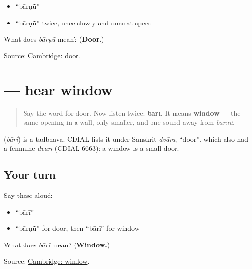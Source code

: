 \begin{itemize}
\raggedright
  \item \textquotedblleft{}bārṇũ\textquotedblright{}
  \item \textquotedblleft{}bārṇũ\textquotedblright{} twice, once slowly and once at speed
\end{itemize}

\begin{tcolorbox}[breakable,colback=teal!4,colframe=teal!35!black,title={Before you move on}]
What does \emph{bārṇũ} mean? (\textbf{Door.})

Source: \href{https://dictionary.cambridge.org/dictionary/english-gujarati/door}{Cambridge: door}.
\end{tcolorbox}
\section[\texorpdfstring{\gu{બારી} (bārī)}{બારી (bārī)}]{ — hear window}

\label{lesson:GU-C28-hear-baari}



\begin{quote}
Say the word for door. Now listen twice: \textbf{bārī}. It means \textbf{window} — the same opening in a wall, only smaller, and one sound away from \emph{bārṇũ}.
\end{quote}

\begin{cousinweb}
\textbf{} (\emph{bārī}) is a tadbhava. CDIAL lists it under Sanskrit \emph{dvāra}, \textquotedblleft{}door\textquotedblright{}, which also had a feminine \emph{dvārī} (CDIAL 6663): a window is a small door.
\end{cousinweb}

\subsection*{Your turn}
Say these aloud:

\begin{itemize}
\raggedright
  \item \textquotedblleft{}bārī\textquotedblright{}
  \item \textquotedblleft{}bārṇũ\textquotedblright{} for door, then \textquotedblleft{}bārī\textquotedblright{} for window
\end{itemize}

\begin{tcolorbox}[breakable,colback=teal!4,colframe=teal!35!black,title={Before you move on}]
What does \emph{bārī} mean? (\textbf{Window.})

Source: \href{https://dictionary.cambridge.org/dictionary/english-gujarati/window}{Cambridge: window}.
\end{tcolorbox}
